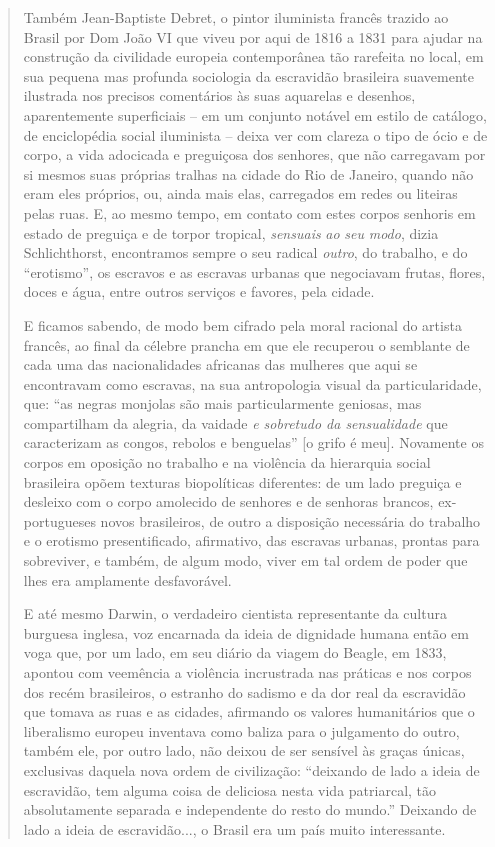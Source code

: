\begin{quote}
Também Jean-Baptiste Debret, o pintor iluminista francês trazido ao
Brasil por Dom João VI que viveu por aqui de 1816 a 1831 para ajudar na
construção da civilidade europeia contemporânea tão rarefeita no local,
em sua pequena mas profunda sociologia da escravidão brasileira
suavemente ilustrada nos precisos comentários às suas aquarelas e
desenhos, aparentemente superficiais -- em um conjunto notável em estilo
de catálogo, de enciclopédia social iluminista -- deixa ver com clareza
o tipo de ócio e de corpo, a vida adocicada e preguiçosa dos senhores,
que não carregavam por si mesmos suas próprias tralhas na cidade do Rio
de Janeiro, quando não eram eles próprios, ou, ainda mais elas,
carregados em redes ou liteiras pelas ruas. E, ao mesmo tempo, em
contato com estes corpos senhoris em estado de preguiça e de torpor
tropical, \emph{sensuais} \emph{ao} \emph{seu} \emph{modo}, dizia
Schlichthorst, encontramos sempre o seu radical \emph{outro}, do
trabalho, e do ``erotismo'', os escravos e as escravas urbanas que
negociavam frutas, flores, doces e água, entre outros serviços e
favores, pela cidade.

E ficamos sabendo, de modo bem cifrado pela moral racional do artista
francês, ao final da célebre prancha em que ele recuperou o semblante de
cada uma das nacionalidades africanas das mulheres que aqui se
encontravam como escravas, na sua antropologia visual da
particularidade, que: ``as negras monjolas são mais particularmente
geniosas, mas compartilham da alegria, da vaidade \emph{e sobretudo da
sensualidade} que caracterizam as congos, rebolos e benguelas'' {[}o
grifo é meu{]}. Novamente os corpos em oposição no trabalho e na
violência da hierarquia social brasileira opõem texturas biopolíticas
diferentes: de um lado preguiça e desleixo com o corpo amolecido de
senhores e de senhoras brancos, ex-portugueses novos brasileiros, de
outro a disposição necessária do trabalho e o erotismo presentificado,
afirmativo, das escravas urbanas, prontas para sobreviver, e também, de
algum modo, viver em tal ordem de poder que lhes era amplamente
desfavorável.

E até mesmo Darwin, o verdadeiro cientista representante da cultura
burguesa inglesa, voz encarnada da ideia de dignidade humana então em
voga que, por um lado, em seu diário da viagem do Beagle, em 1833,
apontou com veemência a violência incrustrada nas práticas e nos corpos
dos recém brasileiros, o estranho do sadismo e da dor real da escravidão
que tomava as ruas e as cidades, afirmando os valores humanitários que o
liberalismo europeu inventava como baliza para o julgamento do outro,
também ele, por outro lado, não deixou de ser sensível às graças únicas,
exclusivas daquela nova ordem de civilização: ``deixando de lado a ideia
de escravidão, tem alguma coisa de deliciosa nesta vida patriarcal, tão
absolutamente separada e independente do resto do mundo.'' Deixando de
lado a ideia de escravidão..., o Brasil era um país muito interessante.


\end{quote}
